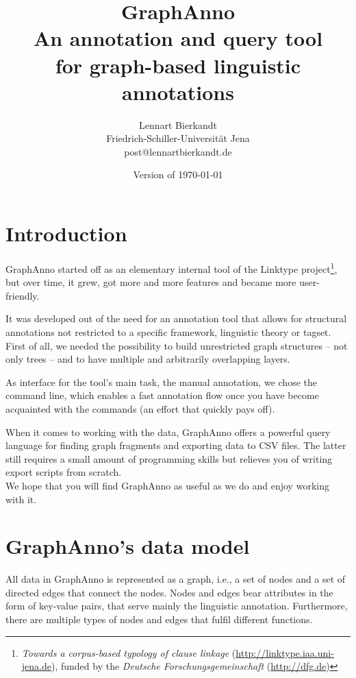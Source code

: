 \documentclass[12pt]{scrartcl}
\title{\LARGE GraphAnno\\ \large An annotation and query tool\\for graph-based linguistic annotations}
\author{Lennart Bierkandt\\\large Friedrich-Schiller-Universität Jena\\[-.2em]\large post@lennartbierkandt.de}
\date{Version of \today}
\begin{document}
\maketitle

\renewcommand{\baselinestretch}{1.05}\normalsize

\tableofcontents



\section{Introduction}

GraphAnno started off as an elementary internal tool of the Linktype project\footnote{\textit{Towards a corpus-based typology of clause linkage} (\url{http://linktype.iaa.uni-jena.de}), funded by the \textit{Deutsche Forschungsgemeinschaft} (\url{http://dfg.de})}, but over time, it grew, got more and more features and became more user-friendly.

It was developed out of the need for an annotation tool that allows for structural annotations not restricted to a specific framework, linguistic theory or tagset.
First of all, we needed the possibility to build unrestricted graph structures – not only trees – and to have multiple and arbitrarily overlapping layers.

As interface for the tool’s main task, the manual annotation, we chose the command line, which enables a fast annotation flow once you have become acquainted with the commands (an effort that quickly pays off).

When it comes to working with the data, GraphAnno offers a powerful query language for finding graph fragments and exporting data to CSV files.
The latter still requires a small amount of programming skills but relieves you of writing export scripts from scratch.\\

We hope that you will find GraphAnno as useful as we do and enjoy working with it.



\section{GraphAnno’s data model}

All data in GraphAnno is represented as a graph, i.e., a set of nodes and a set of directed edges that connect the nodes.
Nodes and edges bear attributes in the form of key-value pairs, that serve mainly the linguistic annotation.
Furthermore, there are multiple types of nodes and edges that fulfil different functions.
\end{document}
